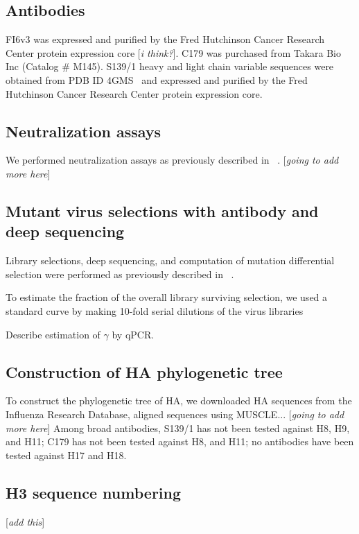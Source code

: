 \documentclass[11pt]{article}
\newcommand{\comment}[1]{{\color{red}[\textsl{#1}]}}
\begin{document}
\subsection*{Antibodies}
FI6v3 was expressed and purified by the Fred Hutchinson Cancer Research Center protein expression core \comment{i think?}.
C179 was purchased from Takara Bio Inc (Catalog \# M145).
S139/1 heavy and light chain variable sequences were obtained from PDB ID 4GMS~\cite{lee2012heterosubtypic} and expressed and purified by the Fred Hutchinson Cancer Research Center protein expression core.

\subsection*{Neutralization assays}
We performed neutralization assays as previously described in ~\citep{}.
\comment{going to add more here}

\subsection*{Mutant virus selections with antibody and deep sequencing}
Library selections, deep sequencing, and computation of mutation differential selection were performed as previously described in ~\cite{doud2017complete}. 

To estimate the fraction of the overall library surviving selection, we used a standard curve by making 10-fold serial dilutions of the virus libraries

Describe estimation of $\gamma$ by qPCR.

\subsection*{Construction of HA phylogenetic tree}
To construct the phylogenetic tree of HA, we downloaded HA sequences from the Influenza Research Database, aligned sequences using MUSCLE... \comment{going to add more here}
Among broad antibodies, S139/1 has not been tested against H8, H9, and H11; C179 has not been tested against H8, and H11; no antibodies have been tested against H17 and H18.

\subsection*{H3 sequence numbering}
\comment{add this}
\end{document}
